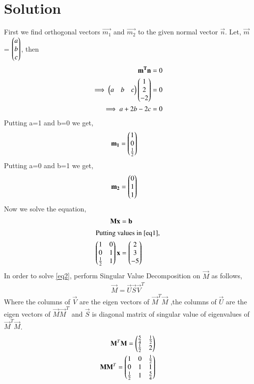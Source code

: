 \documentclass[journal,12pt,twocolumn]{IEEEtran}
\begin{document}
 \section{\textbf{Solution}}
First we find orthogonal vectors $\vec{m_1}$ and $\vec{m_2}$ to the given normal vector $\vec{n}$. Let, $\vec{m}$ = $\begin{pmatrix}a\\b\\c\end{pmatrix}$, then
\begin{align}
\mathbf{m^T}\mathbf{n} &= 0\\
\implies\begin{pmatrix}a&b&c\end{pmatrix}\begin{pmatrix}1\\2\\-2\end{pmatrix} &= 0\\
\implies a+2b-2c &= 0
\end{align}
Putting a=1 and b=0 we get,
\begin{align}
\mathbf{m_1} &= \begin{pmatrix}1\\0\\\frac{1}{2}\end{pmatrix}\end{align}
Putting a=0 and b=1 we get,
\begin{align}
\mathbf{m_2} &= \begin{pmatrix}0\\1\\1\end{pmatrix}
\end{align}
Now we solve the equation,
\begin{align}
\mathbf{M}\mathbf{x} &= \mathbf{b}\label{eq1}\\
\intertext{Putting values in \eqref{eq1},}
\begin{pmatrix}1&0\\0&1\\\frac{1}{2}&1\end{pmatrix}\mathbf{x} &= \begin{pmatrix}2\\3\\-5\end{pmatrix}\label{eq2}
\end{align}
In order to solve \eqref{eq2},  perform Singular Value Decomposition on $\vec{M}$ as follows,
\begin{align}
\vec{M}=\vec{U}\vec{S}\vec{V}^T\label{eq100}
\end{align}
Where the columns of $\vec{V}$ are the eigen vectors of $\vec{M}^T\vec{M}$ ,the columns of $\vec{U}$ are the eigen vectors of $\vec{M}\vec{M}^T$ and $\vec{S}$ is diagonal matrix of singular value of eigenvalues of $\vec{M}^T\vec{M}$.
\begin{align}
\mathbf{M}^T\mathbf{M}=\begin{pmatrix}\frac{5}{4}&\frac{1}{2}\\\frac{1}{2}&2\end{pmatrix}\label{eqMTM}\\
\mathbf{M}\mathbf{M}^T=\begin{pmatrix}1&0&\frac{1}{2}\\0&1&1\\\frac{1}{2}&1&\frac{5}{4}\end{pmatrix}
\end{align}
\end{document}

